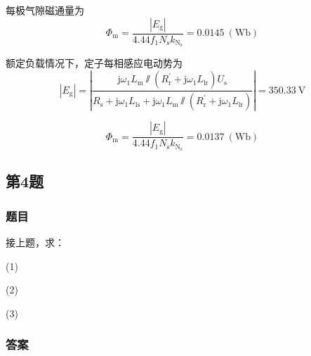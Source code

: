 \documentclass[12pt, a4paper, UTF8, fontset=adobe, oneside]{ctexbook} %
\begin{document}
每极气隙磁通量为
\begin{equation}
  \Phi_{\mathrm{m}} = \frac{\left|E_{\mathrm{g}}\right|}{4.44f_1N_{\mathrm{s}}k_{\mathrm{N}_{\mathrm{s}}}} = 0.0145\ \mathrm{(Wb)}
\end{equation}

额定负载情况下，定子每相感应电动势为
\begin{equation}
  \left| E_{\mathrm{g}} \right| = \left|{\dfrac{\mathrm{j}\omega_1L_{\mathrm{m}} \sslash (R_{\mathrm{r}}^{'}+\mathrm{j}\omega_1L_{\mathrm{lr}})U_{\mathrm{s}}}{R_{\mathrm{s}}+\mathrm{j}\omega_1L_{\mathrm{ls}}+\mathrm{j}\omega_1L_{\mathrm{m}} \sslash (R_{\mathrm{r}}^{'}+\mathrm{j}\omega_1L_{\mathrm{lr}})}} \right| = 350.33\ \mathrm{V}
\end{equation}

\begin{equation}
  \Phi_{\mathrm{m}} = \frac{\left|E_{\mathrm{g}}\right|}{4.44f_1N_{\mathrm{s}}k_{\mathrm{N}_{\mathrm{s}}}} = 0.0137\ \mathrm{(Wb)}
\end{equation}


\subsection{第4题}
\subsubsection{题目}
接上题，求：

(1) 

(2)

(3)
\subsubsection{答案}



\end{document}
